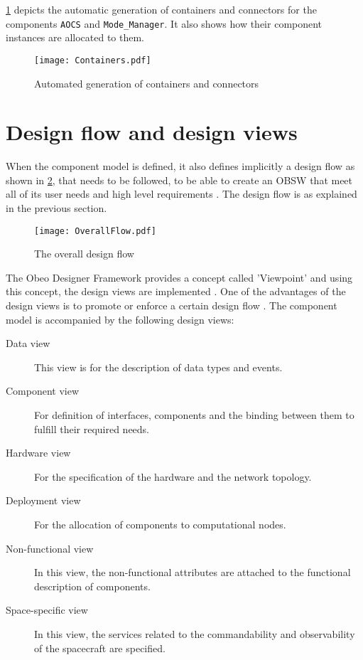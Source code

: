 \cref{fig: Containers} depicts the automatic generation of containers and connectors for the components \texttt{AOCS} and \texttt{Mode\_Manager}. It also shows how their component instances are allocated to them. 

\begin{figure}[h]
	\centering
	\texttt{[image: Containers.pdf]}
	\caption{Automated generation of containers and connectors}
	\label{fig: Containers}
\end{figure}

\section{Design flow and design views}
\label{section: Design flow and views}
When the component model is defined, it also defines implicitly a design flow as shown in \cref{fig: Design flow}, that needs to be followed, to be able to create an OBSW that meet all of its user needs and high level requirements \cite{SAVOIR}\cite{PhdThesis}\cite{CompBasedProcess}. The design flow is as explained in the previous section. 

\begin{figure}[h]
	\centering
	\texttt{[image: OverallFlow.pdf]}
	\caption{The overall design flow}
	\label{fig: Design flow}
\end{figure}

The Obeo Designer Framework \cite{obeoDesigner} provides a concept called 'Viewpoint' and using this concept, the design views are implemented \cite{CompBasedProcess}. One of the advantages of the design views is to promote or enforce a certain design flow \cite{CompBasedProcess}. The component model is accompanied by the following design views:
\begin{description}
\item [Data view] This view is for the description of data types and events.
\item [Component view] For definition of interfaces, components and the binding between them to fulfill their required needs.
\item [Hardware view] For the specification of the hardware and the network topology.
\item [Deployment view] For the allocation of components to computational nodes.
\item [Non-functional view] In this view, the non-functional attributes are attached to the functional description of components.
\item [Space-specific view] In this view, the services related to the commandability and observability of the spacecraft are specified.
\end{description}  

